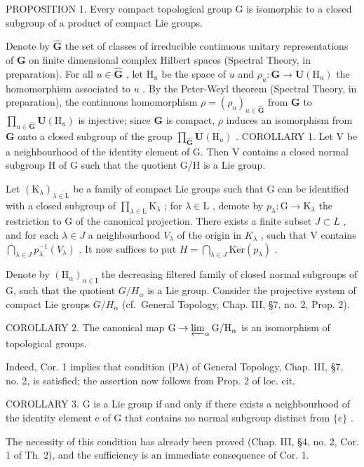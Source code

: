 
PROPOSITION 1. Every compact topological group G is isomorphic to a closed subgroup of a product of compact Lie groups.

Denote by \(\hat{\mathbf{G}}\) the set of classes of irreducible continuous unitary representations of \(\mathbf{G}\) on finite dimensional complex Hilbert spaces (Spectral Theory, in preparation). For all \(u\in \hat{\mathbf{G}}\) , let \(\mathrm{H}_u\) be the space of \(u\) and \(\rho_{u}:\mathbf{G}\to \mathbf{U}(\mathrm{H}_{u})\) the homomorphism associated to \(u\) . By the Peter-Weyl theorem (Spectral Theory, in preparation), the continuous homomorphism \(\rho = (\rho_u)_{u\in \hat{\mathbf{G}}}\) from \(\mathbf{G}\) to \(\prod_{u\in \hat{\mathbf{G}}}\mathbf{U}(\mathrm{H}_u)\) is injective; since \(\mathbf{G}\) is compact, \(\rho\) induces an isomorphism from \(\mathbf{G}\) onto a closed subgroup of the group \(\prod_{\hat{\mathbf{G}}} \mathbf{U}(\mathrm{H}_u)\) .
COROLLARY 1. Let V be a neighbourhood of the identity element of G. Then V contains a closed normal subgroup H of G such that the quotient G/H is a Lie group.

Let \((\mathrm{K}_{\lambda})_{\lambda \in \mathrm{L}}\) be a family of compact Lie groups such that \(\mathrm{G}\) can be identified with a closed subgroup of \(\prod_{\lambda \in \mathrm{L}}\mathrm{K}_{\lambda}\) ; for \(\lambda \in \mathrm{L}\) , demote by \(p_{\lambda}:\mathrm{G}\to \mathrm{K}_{\lambda}\) the restriction to G of the canonical projection. There exists a finite subset \(J \subset L\) , and for each \(\lambda \in J\) a neighbourhood \(V_{\lambda}\) of the origin in \(K_{\lambda}\) , such that V contains \(\bigcap_{\lambda \in J} p_{\lambda}^{-1}(V_{\lambda})\) . It now suffices to put \(H = \bigcap_{\lambda \in J} \text{Ker}(p_{\lambda})\) .

Denote by \((\mathrm{H}_{\alpha})_{\alpha\in\mathrm{I}}\) the decreasing filtered family of closed normal subgroups of G, such that the quotient \(G/H_{\alpha}\) is a Lie group. Consider the projective system of compact Lie groups \(G/H_{\alpha}\) (cf.~General Topology, Chap. III, §7, no. 2, Prop. 2).

COROLLARY 2. The canonical map \(\mathrm{G} \to \varprojlim_{\alpha} \mathrm{G} / \mathrm{H}_{\alpha}\) is an isomorphism of topological groups.

Indeed, Cor. 1 implies that condition (PA) of General Topology, Chap. III, §7, no. 2, is satisfied; the assertion now follows from Prop. 2 of loc. cit.

COROLLARY 3. G is a Lie group if and only if there exists a neighbourhood of the identity element e of G that contains no normal subgroup distinct from \(\{e\}\) .

The necessity of this condition has already been proved (Chap. III, §4, no. 2, Cor. 1 of Th. 2), and the sufficiency is an immediate consequence of Cor. 1.

